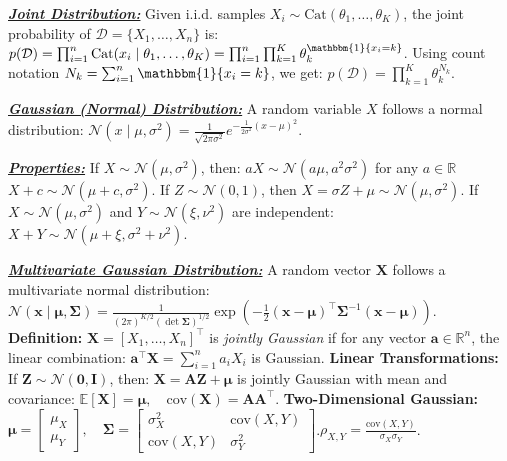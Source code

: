 \documentclass[10pt]{article}
\newcommand{\bulletPoint}[1]{\ul{\textit{\textbf{#1}}}}
\begin{document}
\begin{multicols*}{2}
\bulletPoint{Joint Distribution:} \quad
Given i.i.d. samples $X_i \sim \text{Cat}(\theta_1, \dots, \theta_K)$, the joint probability of $\mathcal{D} = \{X_1, \dots, X_n\}$ is: 
$p(\mathcal{D}) = \prod_{i=1}^{n} \text{Cat}(x_i \mid \theta_1, \dots, \theta_K) = \prod_{i=1}^{n} \prod_{k=1}^{K} \theta_k^{\mathbbm{1}\{x_i = k\}}$. 
Using count notation $N_k = \sum_{i=1}^{n} \mathbbm{1}\{x_i = k\}$, we get:
$p(\mathcal{D}) = \prod_{k=1}^{K} \theta_k^{N_k}$.



\bulletPoint{Gaussian (Normal) Distribution:} \quad
A random variable $X$ follows a normal distribution:
$\mathcal{N}(x \mid \mu, \sigma^2) = \frac{1}{\sqrt{2\pi\sigma^2}} e^{-\frac{1}{2\sigma^2} (x-\mu)^2}$.

\bulletPoint{Properties:} \quad
If $X \sim \mathcal{N}(\mu, \sigma^2)$, then:
$aX \sim \mathcal{N}(a\mu, a^2\sigma^2)$ for any $a \in \mathbb{R}$
$X + c \sim \mathcal{N}(\mu + c, \sigma^2)$. 
If $Z \sim \mathcal{N}(0,1)$, then $X = \sigma Z + \mu \sim \mathcal{N}(\mu, \sigma^2)$. 
If $X \sim \mathcal{N}(\mu, \sigma^2)$ and $Y \sim \mathcal{N}(\xi, \nu^2)$ are independent:
$X + Y \sim \mathcal{N}(\mu + \xi, \sigma^2 + \nu^2)$.


\bulletPoint{Multivariate Gaussian Distribution:} \quad
A random vector $\mathbf{X}$ follows a multivariate normal distribution:
$\mathcal{N}(\mathbf{x} \mid \boldsymbol{\mu}, \boldsymbol{\Sigma}) = \frac{1}{(2\pi)^{K/2} (\det \boldsymbol{\Sigma})^{1/2}} \exp \left( -\frac{1}{2} (\mathbf{x} - \boldsymbol{\mu})^\top \boldsymbol{\Sigma}^{-1} (\mathbf{x} - \boldsymbol{\mu}) \right)$. 
\textbf{Definition:} $\mathbf{X} = [X_1, \dots, X_n]^\top$ is \textit{jointly Gaussian} if for any vector $\mathbf{a} \in \mathbb{R}^n$, the linear combination: $\mathbf{a}^\top \mathbf{X} = \sum_{i=1}^{n} a_i X_i$ is Gaussian. 
\textbf{Linear Transformations:} If $\mathbf{Z} \sim \mathcal{N}(\mathbf{0}, \mathbf{I})$, then: $\mathbf{X} = \mathbf{A} \mathbf{Z} + \boldsymbol{\mu}$  
is jointly Gaussian with mean and covariance: 
$\mathbb{E}[\mathbf{X}] = \boldsymbol{\mu}, \quad \text{cov}(\mathbf{X}) = \mathbf{A} \mathbf{A}^\top$. 
\textbf{Two-Dimensional Gaussian:} 
$\boldsymbol{\mu} = 
\begin{bmatrix} \mu_X \\ \mu_Y \end{bmatrix}, \quad
\boldsymbol{\Sigma} = 
\begin{bmatrix} \sigma_X^2 & \text{cov}(X,Y) \\ \text{cov}(X,Y) & \sigma_Y^2 \end{bmatrix}$.\quad $\rho_{X,Y} = \frac{\text{cov}(X,Y)}{\sigma_X \sigma_Y}$.


\end{multicols*}
\end{document}
